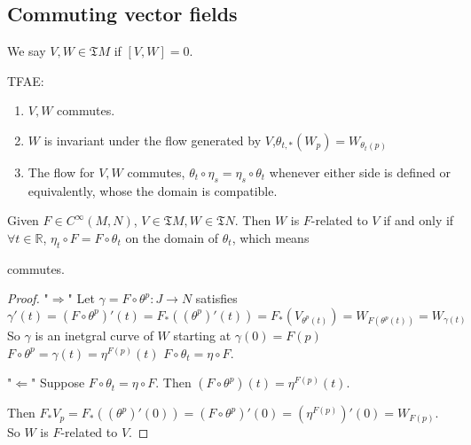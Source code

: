  \subsection{Commuting vector fields}
\begin{definition}
    We say  $ V,W\in\mathfrak{T}M $  if  $ [V,W]=0 $.  
\end{definition}
 \begin{theorem}\label{Equivalent condition of Commuting vector fields}
    TFAE:
    \begin{enumerate}[label=\arabic*]
        \item  $ V,W $ commutes.
        \item   $ W $ is invariant under the flow generated by  $ V $,\ie  $ \theta_{t,*}(W_p)=W_{\theta_t(p)} $
        \item The flow for  $ V,W $ commutes, \ie  $ \theta_t\circ \eta_s=\eta_s\circ \theta_t $ whenever either side is defined or equivalently, whose the domain is compatible.     
    \end{enumerate}
 \end{theorem}
\begin{lemma}
     Given  $ F\in C^\infty(M,N) $,  $ V\in\mathfrak{T}M ,W\in \mathfrak{T}N$. Then  $ W $ is  $ F $-related to  $ V $ if and only  if  $ \forall t\in \mathbb{R} $,  $ \eta_t\circ F=F\circ \theta_t $ on the domain of  $ \theta_t $, which means 
    {\begin{center}
        commutes.
    \end{center}
    
     }
      
\end{lemma}
\begin{proof}
    "$ \Rightarrow $" Let  $ \gamma=F\circ \theta^p:J\rightarrow N $ satisfies 
     \[\gamma'(t)=(F\circ \theta^p)'(t)=F_*((\theta^p)'(t))=F_*(V_{\theta^p(t)})=W_{F(\theta^p(t))}=W_{\gamma(t)}\]
     So  $ \gamma $ is an inetgral curve of  $ W $ starting at  $ \gamma(0)=F(p) $\ie  $ F\circ \theta^p =\gamma(t)=\eta^{F(p)}(t)$ \ie  $ F\circ \theta_t=\eta\circ F $.
     
     "$ \Leftarrow $" Suppose  $ F\circ \theta_t =\eta\circ F $. Then   $ (F\circ \theta^p)(t)=\eta^{F(p)}(t) $.
     
     Then  $ F_*V_p=F_*((\theta^p)'(0))=(F\circ \theta^p)'(0)=(\eta^{F(p)})'(0)=W_{F(p)} $. So  $ W $ is  $ F $-related to  $ V $.   
\end{proof}
